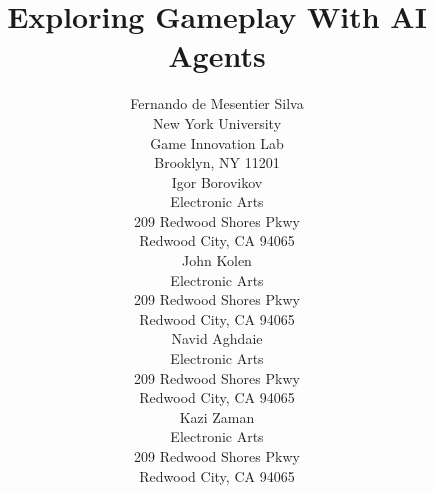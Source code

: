 \documentclass[letterpaper]{article} %
\begin{document}
%
\title{Exploring Gameplay With AI Agents}
\author{Fernando de Mesentier Silva\\
New York University\\
Game Innovation Lab\\
Brooklyn, NY 11201\\
\And
Igor Borovikov\\
Electronic Arts\\
209 Redwood Shores Pkwy\\
Redwood City, CA 94065\\
\And
John Kolen\\
Electronic Arts\\
209 Redwood Shores Pkwy\\
Redwood City, CA 94065\\
\AND
Navid Aghdaie\\
Electronic Arts\\
209 Redwood Shores Pkwy\\
Redwood City, CA 94065\\
\And
Kazi Zaman\\
Electronic Arts\\
209 Redwood Shores Pkwy\\
Redwood City, CA 94065\\
}
\maketitle
\end{document}
